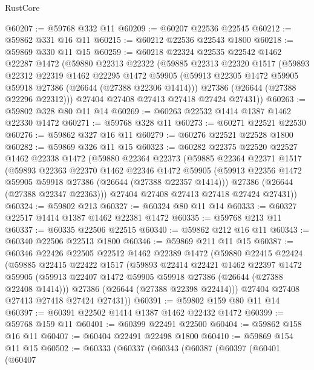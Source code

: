 \begin{lexlean}{RustCore}
\begin{coremodule}
@60207 := @59768 @332 @11
@60209 := @60207 @22536 @22545
@60212 := @59862 @331 @16 @11
@60215 := @60212 @22536 @22543 @1800
@60218 := @59869 @330 @11 @15
@60259 := @60218
    @22324
    @22535
    @22542
    @1462
    @22287
    @1472
    (@59880
      @22313
      @22322
      (@59885
        @22313
        @22320
        @1517
        (@59893
          @22312
          @22319
          @1462
          @22295
          @1472
          @59905
          (@59913 @22305 @1472 @59905 @59918 @27386 (@26644 (@27388 @22306 @1414)))
          @27386
          (@26644 (@27388 @22296 @22312)))
        @27404
        @27408
        @27413
        @27418
        @27424
        @27431))
@60263 := @59802 @328 @80 @11 @14
@60269 := @60263 @22532 @1414 @1387 @1462 @22330 @1472
@60271 := @59768 @328 @11
@60273 := @60271 @22521 @22530
@60276 := @59862 @327 @16 @11
@60279 := @60276 @22521 @22528 @1800
@60282 := @59869 @326 @11 @15
@60323 := @60282
    @22375
    @22520
    @22527
    @1462
    @22338
    @1472
    (@59880
      @22364
      @22373
      (@59885
        @22364
        @22371
        @1517
        (@59893
          @22363
          @22370
          @1462
          @22346
          @1472
          @59905
          (@59913 @22356 @1472 @59905 @59918 @27386 (@26644 (@27388 @22357 @1414)))
          @27386
          (@26644 (@27388 @22347 @22363)))
        @27404
        @27408
        @27413
        @27418
        @27424
        @27431))
@60324 := @59802 @213
@60327 := @60324 @80 @11 @14
@60333 := @60327 @22517 @1414 @1387 @1462 @22381 @1472
@60335 := @59768 @213 @11
@60337 := @60335 @22506 @22515
@60340 := @59862 @212 @16 @11
@60343 := @60340 @22506 @22513 @1800
@60346 := @59869 @211 @11 @15
@60387 := @60346
    @22426
    @22505
    @22512
    @1462
    @22389
    @1472
    (@59880
      @22415
      @22424
      (@59885
        @22415
        @22422
        @1517
        (@59893
          @22414
          @22421
          @1462
          @22397
          @1472
          @59905
          (@59913 @22407 @1472 @59905 @59918 @27386 (@26644 (@27388 @22408 @1414)))
          @27386
          (@26644 (@27388 @22398 @22414)))
        @27404
        @27408
        @27413
        @27418
        @27424
        @27431))
@60391 := @59802 @159 @80 @11 @14
@60397 := @60391 @22502 @1414 @1387 @1462 @22432 @1472
@60399 := @59768 @159 @11
@60401 := @60399 @22491 @22500
@60404 := @59862 @158 @16 @11
@60407 := @60404 @22491 @22498 @1800
@60410 := @59869 @154 @11 @15
@60502 := @60333
    (@60337
      (@60343
        (@60387
          (@60397
            (@60401
              (@60407

\end{coremodule}
\end{lexlean}
